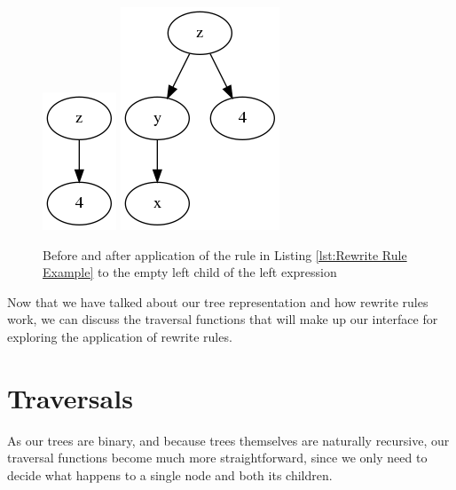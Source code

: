 \documentclass{l4proj}
\begin{document}
\begin{figure}
    \centering
    \includegraphics[scale=0.5]{images/Section4Example0}
    \hspace{2cm}
    \includegraphics[scale=0.5]{images/Section4Example1}
    \caption{Before and after application of the rule in Listing \ref{lst:Rewrite Rule Example} to the empty left child of the left expression}
    \label{fig:RewriteRule_Application_Example}
\end{figure}














Now that we have talked about our tree representation and how rewrite rules work, we can discuss the traversal functions that will make up our interface for exploring the application of rewrite rules.

\section{Traversals}

As our trees are binary, and because trees themselves are naturally recursive, our traversal functions become much more straightforward, since we only need to decide what happens to a single node and both its children. %
\end{document}
